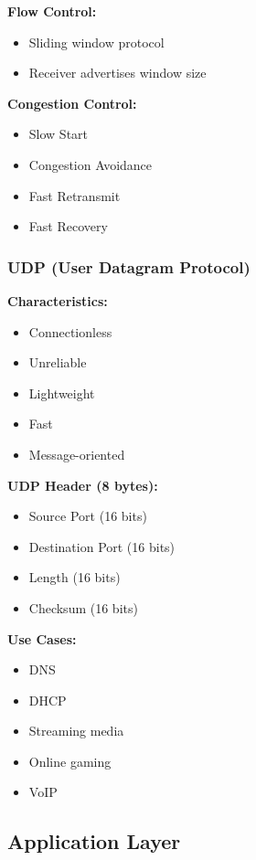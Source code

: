 \documentclass[11pt,a4paper]{article}
\begin{document}
\textbf{Flow Control:}
\begin{itemize}
    \item Sliding window protocol
    \item Receiver advertises window size
\end{itemize}

\textbf{Congestion Control:}
\begin{itemize}
    \item Slow Start
    \item Congestion Avoidance
    \item Fast Retransmit
    \item Fast Recovery
\end{itemize}

\subsubsection{UDP (User Datagram Protocol)}

\textbf{Characteristics:}
\begin{itemize}
    \item Connectionless
    \item Unreliable
    \item Lightweight
    \item Fast
    \item Message-oriented
\end{itemize}

\textbf{UDP Header (8 bytes):}
\begin{itemize}
    \item Source Port (16 bits)
    \item Destination Port (16 bits)
    \item Length (16 bits)
    \item Checksum (16 bits)
\end{itemize}

\textbf{Use Cases:}
\begin{itemize}
    \item DNS
    \item DHCP
    \item Streaming media
    \item Online gaming
    \item VoIP
\end{itemize}

\subsection{Application Layer}
\end{document}

